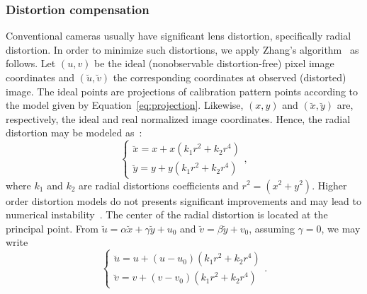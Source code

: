 \subsubsection{Distortion compensation}\label{sec:Zhang}
%
Conventional cameras usually have significant lens distortion, specifically radial distortion.
In order to minimize such distortions, we apply Zhang's algorithm~\cite{Zhang2000a} as follows.
%
Let $(u,v)$ be the ideal (nonobservable distortion-free) pixel image coordinates and
$(\breve{u},\breve{v})$ the corresponding coordinates at observed (distorted) image.
The ideal points are projections of calibration pattern points according to the model given by Equation~\eqref{eq:projection}.
Likewise, $(x,y)$ and $(\breve{x},\breve{y})$ are, respectively, the ideal and real normalized image coordinates.
Hence, the radial distortion may be modeled as~\cite{Zhang2000a}:
%
\begin{equation}
  \begin{cases}
    \breve{x} = x + x(k_1 r^2 + k_2 r^4) \\%
    \breve{y} = y + y(k_1 r^2 + k_2 r^4) %
   \end{cases},
\end{equation}
%
where $k_1$ and $k_2$ are radial distortions coefficients and $r^2 = (x^2 + y^2)$.
Higher order distortion models do not presents significant improvements and may lead to numerical instability~\cite{Zhang2000a}.
The center of the radial distortion is located at the principal point.
From
$\breve{u} = \alpha \breve{x} + \gamma \breve{y} + u_0 $ and $\breve{v} = \beta \breve{y} + v_0$, assuming $\gamma = 0$,
we may write
%
\begin{equation}
\begin{cases}
  \breve{u} = u + (u-u_0)(k_1 r^2 + k_2 r^4 ) \\
  \breve{v} = v + (v-v_0)(k_1 r^2 + k_2 r^4 )
\end{cases}.
\label{eq:u_dist}
\end{equation}

